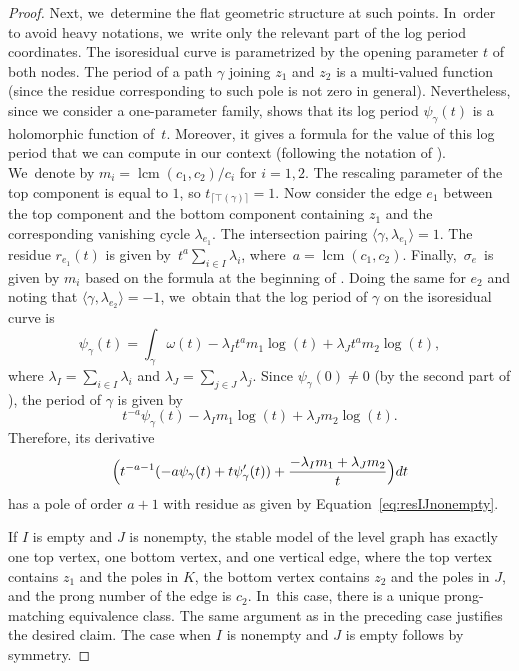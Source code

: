 \documentclass[11pt]{article}
\DeclareMathOperator{\lcm}{lcm}
\theoremstyle{definition}
\begin{document}
\begin{proof}
Next, we~determine the flat geometric structure at such points. In~order to avoid heavy notations, we~write only the relevant part of the log period coordinates. The isoresidual curve is parametrized by the opening parameter $t$ of both nodes. The period of a path $\gamma$ joining $z_{1}$ and $z_{2}$ is a multi-valued function (since the residue corresponding to such pole is not zero in general). Nevertheless, since we consider a one-parameter family, \cite[Cor.\,6.3]{BenBound} shows that its log period $\psi_{\gamma}(t)$ is a holomorphic function of~$t$. Moreover, it gives a formula for the value of this log period that we can compute in our context (following the notation of \cite[Def.\,5.1]{BenBound}). We~denote by $m_{i}=\lcm (c_1, c_2)/c_{i}$ for $i=1,2$. The rescaling parameter of the top component is equal to $1$, so $t_{\lceil\top(\gamma)\rceil}=1$. Now consider the edge $e_{1}$ between the top component and the bottom component containing $z_{1}$ and the corresponding vanishing cycle $\lambda_{e_{1}}$. The intersection pairing $\langle\gamma,\lambda_{e_{1}}\rangle = 1$. The residue $r_{e_{1}}(t)$ is given by~$t^{a}\sum_{i\in I}\lambda_{i}$, where~$a = \lcm (c_1, c_2)$. Finally,~$\sigma_{e}$~is given by $m_{i}$ based on the formula at the beginning of \cite[\S 7.4]{BenBound}. Doing the same for $e_{2}$ and noting that $\langle\gamma,\lambda_{e_{2}}\rangle = -1$, we~obtain that the log period of $\gamma$ on the isoresidual curve is
\begin{equation*}
\psi_{\gamma}(t) = \int_{\gamma}\omega(t) - \lambda_{I}t^{a}m_{1}\log(t)+\lambda_{J}t^{a}m_{2}\log(t),
\end{equation*}
where $\lambda_I = \sum_{i\in I}\lambda_{i}$ and $\lambda_J = \sum_{j\in J}\lambda_{j}$.
Since $\psi_{\gamma}(0)\neq0$ (by the second part of \cite[Cor.\,6.3]{BenBound}), the period of $\gamma$ is given by
\[
t^{-a}\psi_{\gamma}(t) - \lambda_{I}m_{1}\log(t)+\lambda_{J}m_{2}\log(t).
\]
Therefore, its derivative
\[
\Bigl(t^{-a-1}(-a\psi_{\gamma}(t)+t\psi_{\gamma}'(t)) + \frac{-\lambda_{I}m_{1} + \lambda_{J}m_{2}}{t}\Bigr)dt
\]
has a pole of order $a+1$ with residue as given by Equation~\eqref{eq:resIJnonempty}.

If $I$ is empty and $J$ is nonempty, the stable model of the level graph has exactly one top vertex, one bottom vertex, and one vertical edge, where the top vertex contains $z_1$ and the poles in $K$, the bottom vertex contains $z_2$ and the poles in $J$, and the prong number of the edge is $c_2$. In~this case, there is a unique prong-matching equivalence class. The same argument as in the preceding case justifies the desired claim. The case when $I$ is nonempty and $J$ is empty follows by symmetry.


\end{proof}
\end{document}
